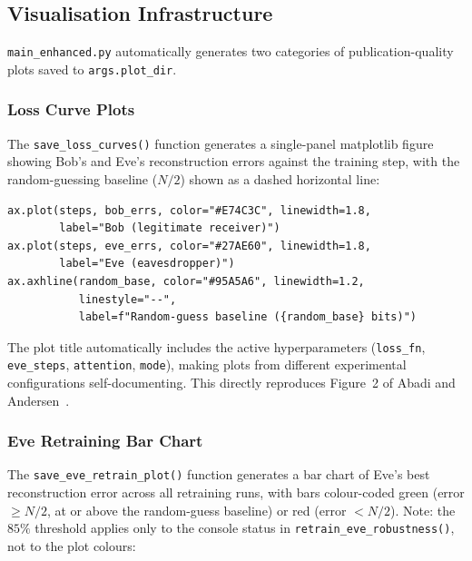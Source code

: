 \documentclass[12pt, a4paper]{article}
\newcommand{\code}[1]{\texttt{\color{CodeRed}#1}}
\begin{document}
\subsection{Visualisation Infrastructure}
\label{subsec:visualisation}

\code{main\_enhanced.py} automatically generates two categories of
publication-quality plots saved to \code{args.plot\_dir}.

\subsubsection*{Loss Curve Plots}

The \code{save\_loss\_curves()} function generates a single-panel
matplotlib figure showing Bob's and Eve's reconstruction errors
against the training step, with the random-guessing baseline
($N/2$) shown as a dashed horizontal line:

\begin{lstlisting}[caption={Loss curve generation in \code{save\_loss\_curves()}}]
ax.plot(steps, bob_errs, color="#E74C3C", linewidth=1.8,
        label="Bob (legitimate receiver)")
ax.plot(steps, eve_errs, color="#27AE60", linewidth=1.8,
        label="Eve (eavesdropper)")
ax.axhline(random_base, color="#95A5A6", linewidth=1.2,
           linestyle="--",
           label=f"Random-guess baseline ({random_base} bits)")
\end{lstlisting}

The plot title automatically includes the active hyperparameters
(\code{loss\_fn}, \code{eve\_steps}, \code{attention}, \code{mode}),
making plots from different experimental configurations
self-documenting. This directly reproduces Figure~2 of
Abadi and Andersen~\cite{abadi2016learning}.

\subsubsection*{Eve Retraining Bar Chart}

The \code{save\_eve\_retrain\_plot()} function generates a bar chart
of Eve's best reconstruction error across all retraining runs, with
bars colour-coded green (error $\geq N/2$, at or above the
random-guess baseline) or red (error $< N/2$). Note: the $85\%$
threshold applies only to the console status in
\code{retrain\_eve\_robustness()}, not to the plot colours:
\end{document}
